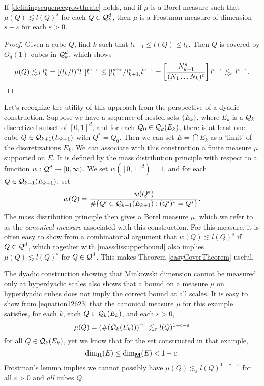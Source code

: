 \begin{theorem} \label{easyCoverTheorem}
	If \eqref{definingsequencegrowthrate} holds, and if $\mu$ is a Borel measure such that $\mu(Q) \lesssim l(Q)^s$ for each $Q \in \operatorname{\mathcal{Q}}_k^d$, then $\mu$ is a Frostman measure of dimension $s - \varepsilon$ for each $\varepsilon > 0$.
\end{theorem}
\begin{proof}
	Given a cube $Q$, find $k$ such that $l_{k+1} \leq l(Q) \leq l_k$. Then $Q$ is covered by $O_d(1)$ cubes in $\operatorname{\mathcal{Q}}^d_k$, which shows
	\[ \mu(Q) \lesssim_d l_k^s = [(l_k/l)^s l^\varepsilon ] l^{s - \varepsilon} \leq [l_k^{s + \varepsilon} / l_{k+1}^s] l^{s - \varepsilon} = \left[ \frac{N_{k+1}^s}{(N_1 \dots N_k)^\varepsilon} \right] l^{s-\varepsilon} \lesssim_\varepsilon l^{s-\varepsilon}. \qedhere \]
\end{proof}	

Let's recognize the utility of this approach from the perspective of a dyadic construction. Suppose we have a sequence of nested sets $\{ E_k \}$, where $E_k$ is a $\operatorname{\mathcal{Q}}_k$ discretized subset of $[0,1]^d$, and for each $Q_0 \in \operatorname{\mathcal{Q}}_k(E_k)$, there is at least one cube $Q \in \operatorname{\mathcal{Q}}_{k+1}(E_{k+1})$ with $Q^* = Q_0$. Then we can set $E = \bigcap E_k$ as a `limit' of the discretizations $E_k$. We can associate with this construction a finite measure $\mu$ supported on $E$. It is defined by the mass distribution principle with respect to a funciton $w: \operatorname{\mathcal{Q}}^d \to [0,\infty)$. We set $w([0,1]^d) = 1$, and for each $Q \in \operatorname{\mathcal{Q}}_{k+1}(E_{k+1})$, set
%
\[ w(Q) = \frac{w(Q^*)}{\# \{ Q' \in \operatorname{\mathcal{Q}}_{k+1}(E_{k+1}) : (Q')^* = Q^* \}}. \]
%
The mass distribution principle then gives a Borel measure $\mu$, which we refer to as the \emph{canonical measure} associated with this construction. For this measure, it is often easy to show from a combinatorial argument that $w(Q) \lesssim l(Q)^s$ if $Q \in \operatorname{\mathcal{Q}}^d$, which together with \eqref{massdissupperbound} also implies $\mu(Q) \lesssim l(Q)^s$ for $Q \in \operatorname{\mathcal{Q}}^d$. This makes Theorem \ref{easyCoverTheorem} useful.

\begin{remark}
	The dyadic construction showing that Minkowski dimension cannot be measured only at hyperdyadic scales also shows that a bound on a measure $\mu$ on hyperdyadic cubes does not imply the correct bound at all scales. It is easy to show from \eqref{equation12623} that the canonical measure $\mu$ for this example satisfies, for each $k$, each $Q \in \operatorname{\mathcal{Q}}_k(E_k)$, and each $\varepsilon > 0$,
	\[ \mu(Q) = \left( \#(\operatorname{\mathcal{Q}}_k(E_k)) \right)^{-1} \lesssim_\varepsilon l(Q)^{1-c-\varepsilon} \]
	for all $Q \in \operatorname{\mathcal{Q}}_k(E_k)$, yet we know that for the set constructed in that example,
	\[ \operatorname{\dim_{\mathbf{H}}}(E) \leq \operatorname{\dim_{\underline{\mathbf{M}}}}(E) < 1 - c. \]
	Frostman's lemma implies we cannot possibly have $\mu(Q) \lesssim_\varepsilon l(Q)^{1-c-\varepsilon}$ for all $\varepsilon > 0$ and \emph{all} cubes $Q$.
\end{remark}

